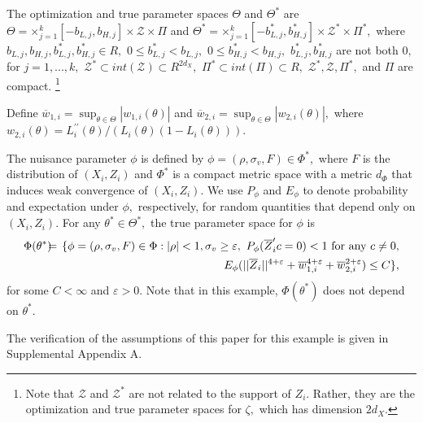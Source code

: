 \documentclass[12pt,titlepage,final,oneside,letterpaper]{article}
\begin{document}
The optimization and true parameter spaces $\Theta $ and $\Theta ^{\ast }$
are $\Theta =\mathbf{\times }_{j=1}^{k}[-b_{L,j},b_{H,j}]\times \mathcal{Z}%
\times \Pi $ and $\Theta ^{\ast }=\mathbf{\times }_{j=1}^{k}[-b_{L,j}^{\ast
},b_{H,j}^{\ast }]\times \mathcal{Z}^{\ast }\times \Pi ^{\ast },$ where $%
b_{L,j},b_{H,j},b_{L,j}^{\ast },b_{H,j}^{\ast }\in R,$ $0\leq b_{L,j}^{\ast
}<b_{L,j},$ $0\leq b_{H,j}^{\ast }<b_{H,j},$ $b_{L,j}^{\ast },b_{H,j}^{\ast
} $ are not both $0,$ for $j=1,...,k,$ $\mathcal{Z}^{\ast }\subset int(%
\mathcal{Z})\subset R^{2d_{X}},$ $\Pi ^{\ast }\subset int(\Pi )\subset R,$ $%
\mathcal{Z}^{\ast },\mathcal{Z},\Pi ^{\ast },$ and $\Pi $ are compact.%
\footnote{%
Note that $\mathcal{Z}$ and $\mathcal{Z}^{\ast }$ are not related to the
support of $Z_{i}.$ Rather, they are the optimization and true parameter
spaces for $\zeta ,$ which has dimension $2d_{X}.$}

Define $\overline{w}_{1,i}=\sup_{\theta \in \Theta }|w_{1,i}(\theta )|$ and $%
\overline{w}_{2,i}=\sup_{\theta \in \Theta }|w_{2,i}(\theta )|,$ where $%
w_{2,i}(\theta )=L_{i}^{\prime \prime }(\theta )/$\linebreak $(L_{i}(\theta
)(1-L_{i}(\theta ))).$

The nuisance parameter $\phi $ is defined by $\phi =(\rho ,\sigma _{v},F)\in
\Phi ^{\ast },$ where $F$ is the distribution of $(X_{i},Z_{i})$ and $\Phi
^{\ast }$ is a compact metric space with a metric $d_{\Phi }$ that induces
weak convergence of $(X_{i},Z_{i}).$ We use $P_{\phi }$ and $E_{\phi }$ to
denote probability and expectation under $\phi ,$ respectively, for random
quantities that depend only on $(X_{i},Z_{i}).$ For any $\theta ^{\ast }\in
\Theta ^{\ast },$ the true parameter space for $\phi $ is%
\begin{eqnarray}
\Phi (\theta ^{\ast })\hspace{-0.08in} &=&\hspace{-0.08in}\{\phi =(\rho
,\sigma _{v},F)\in \Phi :|\rho |<1,\sigma _{v}\geq \varepsilon ,\text{ }%
P_{\phi }(\overline{Z}_{i}^{\prime }c=0)<1\text{ for any }c\neq 0,  \notag \\
&&E_{\phi }(||\overline{Z}_{i}||^{4+\varepsilon }+\overline{w}%
_{1,i}^{4+\varepsilon }+\overline{w}_{2,i}^{2+\varepsilon })\overset{}{\leq }%
C\},  \label{Simul Probit Phi Space}
\end{eqnarray}%
for some $C<\infty $ and $\varepsilon >0.$ Note that in this example, $\Phi
(\theta ^{\ast })$ does not depend on $\theta ^{\ast }.$

The verification of the assumptions of this paper for this example is given
in Supplemental Appendix A.
\end{document}
